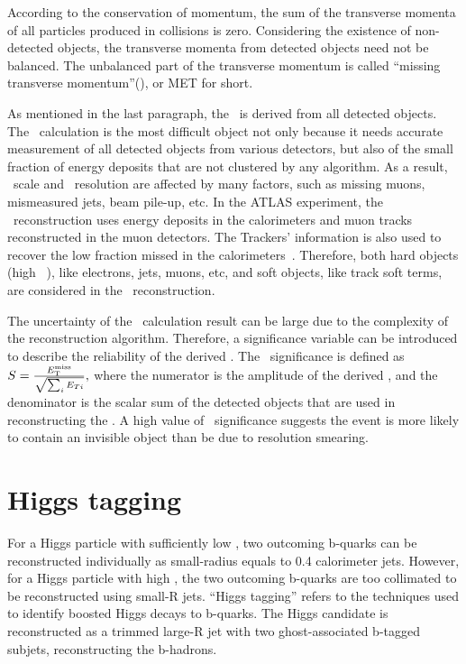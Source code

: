 \par According to the conservation of momentum, the sum of the transverse momenta of all particles produced in collisions is zero. Considering the existence of non-detected objects, the transverse momenta from detected objects need not be balanced. The unbalanced part of the transverse momentum is called ``missing transverse momentum''(\met), or MET for short.

\par As mentioned in the last paragraph, the \met~is derived from all detected objects. The \met~calculation is the most difficult object not only because it needs accurate measurement of all detected objects from various detectors, but also of the small fraction of energy deposits that are not clustered by any algorithm. As a result, \met~scale and \met~resolution are affected by many factors, such as missing muons, mismeasured jets, beam pile-up, etc. In the ATLAS experiment, the \met~reconstruction uses energy deposits in the calorimeters and muon tracks reconstructed in the muon detectors. The Trackers' information is also used to recover the low \pt fraction missed in the calorimeters~\cite{ATLAS-CONF-2013-082}. Therefore, both hard objects (high \pt~), like electrons, jets, muons, etc, and soft objects, like track soft terms, are considered in the \met~reconstruction.

\par The uncertainty of the \met~calculation result can be large due to the complexity of the reconstruction algorithm. Therefore, a significance variable can be introduced to describe the reliability of the derived \met. The \met~significance is defined as
$ S=\frac{E_{\mathrm{T}}^{\mathrm{miss}}}{\sqrt{\sum_{i}E_{Ti}}}, $
where the numerator is the amplitude of the derived \met, and the denominator is the scalar sum of the detected objects that are used in reconstructing the \met. A high value of \met~significance suggests the event is more likely to contain an invisible object than be due to resolution smearing.

\section{Higgs tagging}
\label{sec:higgs}

\par For a Higgs particle with sufficiently low \pt, two outcoming b-quarks can be reconstructed individually as small-radius equals to 0.4 calorimeter jets. However, for a Higgs particle with high \pt, 
the two outcoming b-quarks are too collimated to be reconstructed using small-R jets.
``Higgs tagging'' refers to the techniques used to identify boosted Higgs decays to b-quarks. The Higgs candidate is reconstructed as a trimmed large-R jet with two ghost-associated b-tagged subjets, reconstructing the b-hadrons.

